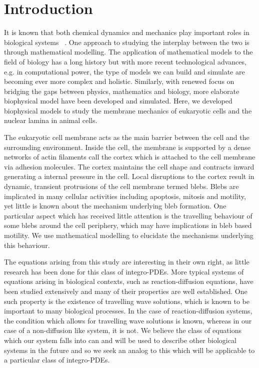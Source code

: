 \chapter{Introduction}

It is known that both chemical dynamics and mechanics play important roles in biological systems ~\cite{Wang2010}. One approach to studying the interplay between the two is through mathematical modelling. The application of mathematical models to the field of biology has a long history but with more recent technological advances, e.g. in computational power, the type of models we can build and simulate are becoming ever more complex and holistic.  Similarly, with renewed focus on bridging the gaps between physics, mathematics and biology, more elaborate biophysical model have been developed and simulated. Here, we developed biophysical models to study the membrane mechanics of eukaryotic cells and the nuclear lamina in animal cells. 

The eukaryotic cell membrane acts as the main barrier between the cell and the surrounding environment. Inside the cell, the membrane is supported by a dense networks of actin filaments call the cortex which is attached to the cell membrane via adhesion molecules. The cortex maintains the cell shape and contracts inward generating a internal pressure in the cell. Local disruptions to the cortex result in dynamic, transient protrusions of the cell membrane termed blebs. Blebs are implicated in many cellular activities including apoptosis, mitosis and motility, yet little is known about the mechanism underlying bleb formation. One particular aspect which has received little attention is the travelling behaviour of some blebs around the cell periphery, which may have implications in bleb based motility. We use mathematical modelling to elucidate the mechanisms underlying this behaviour. 

The equations arising from this study are interesting in their own right, as little research has been done for this class of integro-PDEs. More typical systems of equations arising in biological contexts, such as reaction-diffusion equations, have been studied extensively and many of their properties are well established. One such property is the existence of travelling wave solutions, which is known to be important to many biological processes. In the case of reaction-diffusion systems, the condition which allows for travelling wave solutions is known, whereas in our case of a non-diffusion like system, it is not. We believe the class of equations which our system falls into can and will be used to describe other biological systems in the future and so we seek an analog to this which will be applicable to a particular class of integro-PDEs. 

